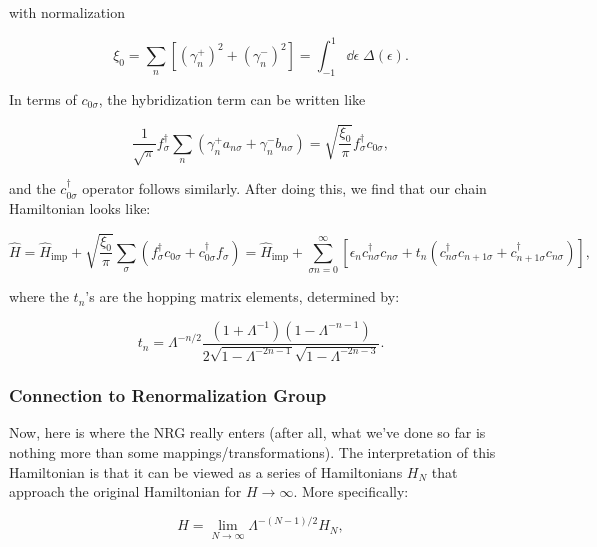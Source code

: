 with normalization

\begin{equation}
  \xi_0 = \sum_n\left[ (\gamma^+_n)^2 + (\gamma^-_n)^2 \right] = \int_{-1}^1 \dd\epsilon \; \Delta(\epsilon).
\end{equation}

In terms of $c_{0\sigma}$, the hybridization term can be written like

\begin{equation}
  \frac{1}{\sqrt{\pi}} f^\dagger_\sigma \sum_n \left( \gamma^+_n a_{n\sigma} + \gamma^-_n b_{n\sigma} \right) = \sqrt{\frac{\xi_0}{\pi}}f^\dagger_\sigma c_{0\sigma},
\end{equation}

and the $c^\dagger_{0\sigma}$ operator follows similarly. After doing this, we find that our chain Hamiltonian looks like:

\begin{equation}
  \hat{H} = \hat{H}_{\mathrm{imp}} + \sqrt{\frac{\xi_0}{\pi}} \sum_\sigma \left( f^\dagger_\sigma c_{0\sigma} + c^\dagger_{0\sigma}f_\sigma \right) = \hat{H}_{\mathrm{imp}} + \sum_{\sigma n=0}^{\infty} \left[ \epsilon_nc^\dagger_{n\sigma}c_{n\sigma} + t_n\left( c^\dagger_{n\sigma}c_{n+1\sigma} + c^\dagger_{n+1\sigma}c_{n\sigma} \right) \right],
\end{equation}

where the $t_n$'s are the hopping matrix elements, determined by:

\begin{equation}
  t_n = \Lambda^{-n/2} \frac{(1 + \Lambda^{-1})(1 - \Lambda^{-n-1})}{2\sqrt{1 - \Lambda^{-2n-1}}\sqrt{1 - \Lambda^{-2n-3}}}.\label{eq:hopping-term}
\end{equation}



\subsubsection{Connection to Renormalization Group}

Now, here is where the NRG really enters (after all, what we've done so far is nothing more than some mappings/transformations). The interpretation of this Hamiltonian is that it can be viewed as a series of Hamiltonians $H_N$ that approach the original Hamiltonian for $H \rightarrow \infty$. More specifically:

\begin{equation}
  H = \lim_{N\rightarrow\infty} \Lambda^{-(N-1)/2}H_N,\label{eq:main-nrg-limit}
\end{equation}

